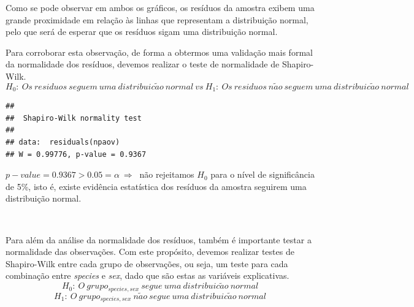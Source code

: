 \documentclass[]{article}
\begin{document}
Como se pode observar em ambos os gráficos, os resíduos da amostra
exibem uma grande proximidade em relação às linhas que representam a
distribuição normal, pelo que será de esperar que os resíduos sigam uma
distribuição normal.

Para corroborar esta observação, de forma a obtermos uma validação mais
formal da normalidade dos resíduos, devemos realizar o teste de
normalidade de Shapiro-Wilk. \[
H_0:\ Os\ residuos\ seguem\ uma\ distribuic\tilde{a}o\ normal\
vs\
H_1:\ Os\ residuos\ n\tilde{a}o\ seguem\ uma\ distribuic\tilde{a}o\ normal
\]

\begin{Shaded}
\begin{Highlighting}[]
\NormalTok{(}
\end{Highlighting}
\end{Shaded}

\begin{verbatim}
## 
##  Shapiro-Wilk normality test
## 
## data:  residuals(npaov)
## W = 0.99776, p-value = 0.9367
\end{verbatim}

\(p-value = 0.9367 > 0.05 = \alpha\ \Rightarrow\ \) não rejeitamos
\(H_0\) para o nível de significância de 5\%, isto é, existe evidência
estatística dos resíduos da amostra seguirem uma distribuição normal.

\(\ \)

Para além da análise da normalidade dos resíduos, também é importante
testar a normalidade das observações. Com este propósito, devemos
realizar testes de Shapiro-Wilk entre cada grupo de observações, ou
seja, um teste para cada combinação entre \emph{species} e \emph{sex},
dado que são estas as variáveis explicativas.
\[ H_0:\ O\ grupo_{species,sex}\ segue\ uma\ distribuic\tilde{a}o\ normal\]
\[ H_1:\ O\ grupo_{species,sex}\ n\tilde{a}o\ segue\ uma\ distribuic\tilde{a}o\ normal\]

\begin{Shaded}
\begin{Highlighting}[]
\SpecialCharTok{\textasciitilde{}}\SpecialCharTok{*}
          \SpecialCharTok{$}
\end{Highlighting}
\end{Shaded}
\end{document}
